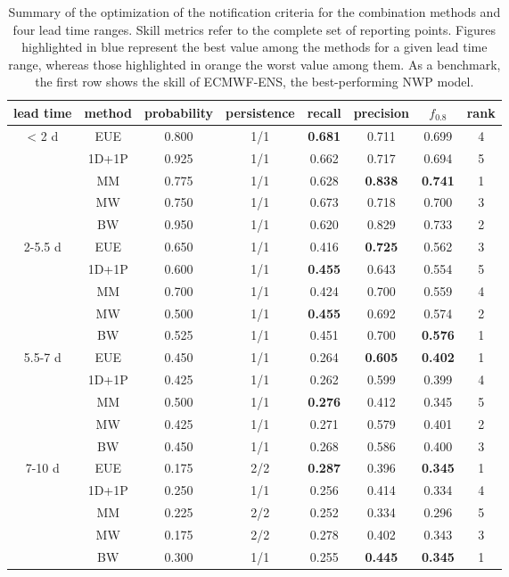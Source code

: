 \documentclass[preprint,12pt]{elsarticle}
\begin{document}
\begin{table}
    \centering
    \caption{Summary of the optimization of the notification criteria for the combination methods and four lead time ranges. Skill metrics refer to the complete set of reporting points. Figures highlighted in blue represent the best value among the methods for a given lead time range, whereas those highlighted in orange the worst value among them. As a benchmark, the first row shows the skill of ECMWF-ENS, the best-performing NWP model.}
    \begin{tabular}{cccccccc}
        \hline
        lead time & method & probability & persistence & recall & precision & $f_{0.8}$ & rank \\
        \hline
        < 2 d& EUE & 0.800 & 1/1 & \textbf{0.681} & 0.711 & 0.699 & 4 \\
         & 1D+1P & 0.925 & 1/1 & 0.662 & 0.717 & 0.694 & 5 \\
         & MM & 0.775 & 1/1 & 0.628 & \textbf{0.838} & \textbf{0.741} & 1 \\
         & MW & 0.750 & 1/1 & 0.673 & 0.718 & 0.700 & 3 \\
         & BW & 0.950 & 1/1 & 0.620 & 0.829 & 0.733 & 2 \\
         \hline
        2-5.5 d& EUE & 0.650 & 1/1 & 0.416 & \textbf{0.725} & 0.562 & 3 \\
         & 1D+1P & 0.600 & 1/1 & \textbf{0.455} & 0.643 & 0.554 & 5 \\
         & MM & 0.700 & 1/1 & 0.424 & 0.700 & 0.559 & 4 \\
         & MW & 0.500 & 1/1 & \textbf{0.455} & 0.692 & 0.574 & 2 \\
         & BW & 0.525 & 1/1 & 0.451 & 0.700 & \textbf{0.576} & 1 \\
         \hline
        5.5-7 d& EUE & 0.450 & 1/1 & 0.264 & \textbf{0.605} & \textbf{0.402} & 1 \\
         & 1D+1P & 0.425 & 1/1 & 0.262 & 0.599 & 0.399 & 4 \\
         & MM & 0.500 & 1/1 & \textbf{0.276} & 0.412 & 0.345 & 5 \\
         & MW & 0.425 & 1/1 & 0.271 & 0.579 & 0.401 & 2 \\
         & BW & 0.450 & 1/1 & 0.268 & 0.586 & 0.400 & 3 \\
         \hline
        7-10 d& EUE & 0.175 & 2/2 & \textbf{0.287} & 0.396 & \textbf{0.345} & 1 \\
         & 1D+1P & 0.250 & 1/1 & 0.256 & 0.414 & 0.334 & 4 \\
         & MM & 0.225 & 2/2 & 0.252 & 0.334 & 0.296 & 5 \\
         & MW & 0.175 & 2/2 & 0.278 & 0.402 & 0.343 & 3 \\
         & BW & 0.300 & 1/1 & 0.255 & \textbf{0.445} & \textbf{0.345} & 1 \\
         \hline
    \end{tabular}
    \label{tab:COMB_optimization}
\end{table}
\end{document}

